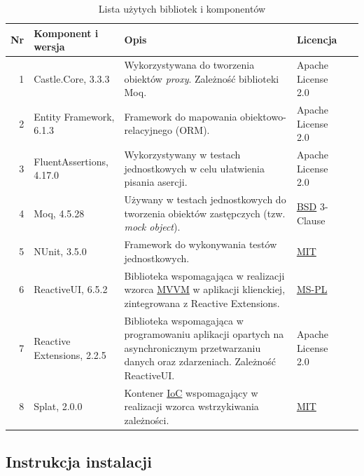 \documentclass[10pt,a4paper]{article}
\begin{document}
\begin{table}[H]
	\begin{tabularx}{\textwidth}{|r|l|X|l|c|}
		\hline
		\textbf{Nr} & \textbf{Komponent i wersja} & \textbf{Opis} & \textbf{Licencja} & \\
		\hline
		1 & 
		Castle.Core, 3.3.3 &
		Wykorzystywana do tworzenia obiektów \textit{proxy}. Zależność biblioteki Moq. &
		Apache License 2.0 &
		\cite{castlecore} \\
		\hline
		2 &
		Entity Framework, 6.1.3 &
		Framework do mapowania obiektowo-relacyjnego (ORM). &
		Apache License 2.0 &
		\cite{entityframework} \\
		\hline
		3 &
		FluentAssertions, 4.17.0 &
		Wykorzystywany w testach jednostkowych w celu ułatwienia pisania asercji. &
		Apache License 2.0 &
		\cite{fluentassertions} \\
		\hline
		4 &
		Moq, 4.5.28 &
		Używany w testach jednostkowych do tworzenia obiektów zastępczych (tzw. \emph{mock object}). &
		\mbox{\hyperref[abbr:bsd]{BSD}} 3-Clause &
		\cite{moq} \\
		\hline
		5 &
		NUnit, 3.5.0 &
		Framework do wykonywania testów jednostkowych. &
		\mbox{\hyperref[abbr:mit]{MIT}} &
		\cite{nunit} \\
		\hline
		6 &
		ReactiveUI, 6.5.2 &
		Biblioteka wspomagająca w realizacji wzorca \hyperref[abbr:mvvm]{MVVM} w aplikacji klienckiej, zintegrowana z Reactive Extensions. &
		\mbox{\hyperref[abbr:mspl]{MS-PL}} &
		\cite{reactiveui} \\
		\hline
		7 &
		Reactive Extensions, 2.2.5 &
		Biblioteka wspomagająca w programowaniu aplikacji opartych na asynchronicznym przetwarzaniu danych oraz zdarzeniach. Zależność ReactiveUI. &
		Apache License 2.0 &
		\cite{reactiveextensions} \\
		\hline
		8 &
		Splat, 2.0.0 &
		Kontener \hyperref[abbr:IoC]{IoC} wspomagający w realizacji wzorca wstrzykiwania zależności. &
		\mbox{\hyperref[abbr:mit]{MIT}} &
		\cite{splat} \\
		\hline
	\end{tabularx}
	\caption{Lista użytych bibliotek i komponentów}
\end{table}

\subsection{Instrukcja instalacji}
%
\end{document}
